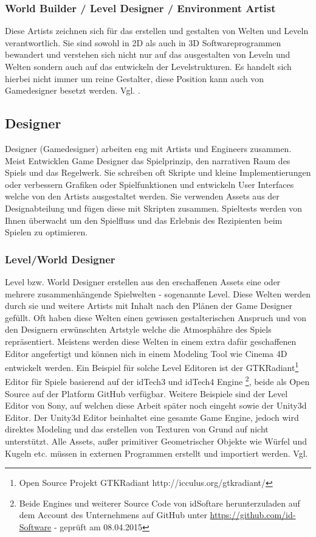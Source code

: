 \documentclass[pagesize, paper=a4, fontsize=12pt, titlepage=true, headings=small, headnosepline, abstractoff, liststotoc, nochapterprefix, plainheadsepline, twoside]{scrreprt}
\begin{document}
\subsubsection{World Builder / Level Designer / Environment Artist}
Diese Artists zeichnen sich für das erstellen und gestalten von Welten und Leveln verantwortlich. Sie sind sowohl in 2D als auch in 3D Softwareprogrammen bewandert und verstehen sich nicht nur auf das ausgestalten von Leveln und Welten sondern auch auf das entwickeln der Levelstrukturen. Es handelt sich hierbei nicht immer um reine Gestalter, diese Position kann auch von Gamedesigner besetzt werden. Vgl. \autocite[S. 24]{Chandler2006}.

\subsection{Designer}
Designer (Gamedesigner) arbeiten eng mit Artists und Engineers zusammen. Meist Entwicklen Game Designer das Spielprinzip, den narrativen Raum des Spiels und das Regelwerk. Sie schreiben oft Skripte und kleine Implementierungen oder verbessern Grafiken oder Spielfunktionen und entwickeln User Interfaces welche von den Artists ausgestaltet werden. Sie verwenden Assets aus der Designabteilung und fügen diese mit Skripten zusammen. Spieltests werden von Ihnen überwacht um den Spielfluss und das Erlebnis des Rezipienten beim Spielen zu optimieren.
\subsubsection{Level/World Designer}
Level bzw. World Designer erstellen aus den erschaffenen Assets eine oder mehrere zusammenhängende Spielwelten - sogenannte Level. Diese Welten werden durch sie und weitere Artists mit Inhalt nach den Plänen der Game Designer gefüllt. Oft haben diese Welten einen gewissen gestalterischen Anspruch und von den Designern erwünschten Artstyle welche die Atmosphähre des Spiels repräsentiert. Meistens werden diese Welten in einem extra dafür geschaffenen Editor angefertigt und können nich in einem Modeling Tool wie Cinema 4D entwickelt werden. Ein Beispiel für solche Level Editoren ist der GTKRadiant\footnote{Open Source Projekt GTKRadiant http://icculus.org/gtkradiant/} Editor für Spiele basierend auf der idTech3 und idTech4  Engine \footnote{Beide Engines und weiterer Source Code von idSoftare herunterzuladen auf dem Account des Unternehmens auf GitHub unter \url{https://github.com/id-Software} - geprüft am 08.04.2015}, beide als Open Source auf der Platform GitHub verfügbar. Weitere Beispiele sind der Level Editor von Sony, auf welchen diese Arbeit später noch eingeht sowie der Unity3d Editor. Der Unity3d Editor beinhaltet eine gesamte Game Engine, jedoch wird direktes Modeling und das erstellen von Texturen von Grund auf nicht unterstützt. Alle Assets, außer primitiver Geometrischer Objekte wie Würfel und Kugeln etc. müssen in externen Programmen erstellt und importiert werden. Vgl. \autocite[S. 31 ]{Chandler2006}
\end{document}
